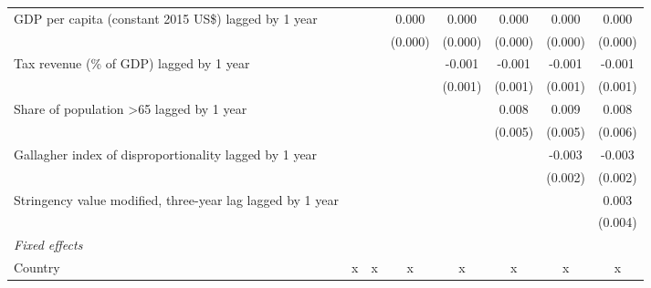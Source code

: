 \begin{tabular}{lccccccc}
   GDP per capita (constant 2015 US\$) lagged by 1 year                                        &              &               & 0.000        & 0.000         & 0.000         & 0.000         & 0.000\\   
                                                                                               &              &               & (0.000)      & (0.000)       & (0.000)       & (0.000)       & (0.000)\\   
   Tax revenue (\% of GDP) lagged by 1 year                                                    &              &               &              & -0.001        & -0.001        & -0.001        & -0.001\\   
                                                                                               &              &               &              & (0.001)       & (0.001)       & (0.001)       & (0.001)\\   
   Share of population >65 lagged by 1 year                                                    &              &               &              &               & 0.008         & 0.009         & 0.008\\   
                                                                                               &              &               &              &               & (0.005)       & (0.005)       & (0.006)\\   
   Gallagher index of disproportionality lagged by 1 year                                      &              &               &              &               &               & -0.003        & -0.003\\   
                                                                                               &              &               &              &               &               & (0.002)       & (0.002)\\   
   Stringency value modified, three-year lag lagged by 1 year                                  &              &               &              &               &               &               & 0.003\\   
                                                                                               &              &               &              &               &               &               & (0.004)\\   
   \emph{Fixed effects}\\
   Country                                                                                     & x            & x             & x            & x             & x             & x             & x\\  

\end{tabular}
